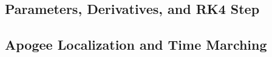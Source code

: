 \documentclass{article}
\begin{document}
\subsection{Parameters, Derivatives, and RK4 Step}

\clearpage
\subsection{Apogee Localization and Time Marching}

\end{document}
